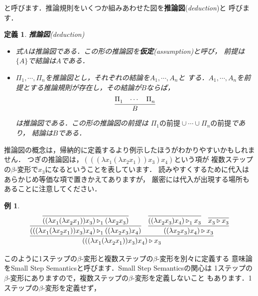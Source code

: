 \documentclass{ltjsbook}%
\newtheorem{definition}{定義}[section]%
\newtheorem{example}{例}[section]%
\newcommand\term[2]{\textbf{#1}{(\textit{#2})}}%
\begin{document}
と呼びます．推論規則をいくつか組みあわせた図を\term{推論図}{deduction}と%
呼びます．%
\begin{definition}%
\term{推論図}{deduction}%
\begin{itemize}%
\item 式$A$は推論図である．この形の推論図を\term{仮定}{assumption}と呼び，%
  前提は$\{A\}$で結論は$A$である．%
\item $\Pi_1^{},\cdots,\Pi_n^{}$を推論図とし，それぞれの結論を$A_1^{},\cdots,A_n^{}$と%
  する．$A_1^{},\cdots,A_n^{}$を前提とする推論規則が存在し，その結論が$B$ならば，%
  \begin{equation}%
    \infer{B}{\Pi_1^{}&\cdots&\Pi_n^{}}%
  \end{equation}%
  は推論図である．この形の推論図の前提は%
  $\Pi_1^{}の前提\cup\cdots\cup\Pi_n^{}の前提$であり，%
  結論は$B$である．%
\end{itemize}%
\end{definition}%
推論図の概念は，帰納的に定義するより例示したほうがわかりやすいかもしれません．%
つぎの推論図は，$(((\lambda x_1^{}(\lambda x_2^{} x_1^{}))x_3^{})x_4^{})$という項が%
複数ステップの$\beta$-変形で$x_3^{}$になるということを表しています．%
読みやすくするために代入はあらかじめ等価な項で置きかえてありますが，%
厳密には代入が出現する場所もあることに注意してください．%
\begin{example}%
  \begin{equation}%
    \infer{%
      (((\lambda x_1^{}(\lambda x_2^{} x_1^{}))x_3^{})x_4^{})\triangleright x_3^{}%
    }{%
      \infer{%
        (((\lambda x_1^{}(\lambda x_2^{} x_1^{}))x_3^{})x_4^{})\triangleright_1^{}%
        ((\lambda x_2^{} x_3^{})x_4^{})%
      }{%
        \infer{%
          ((\lambda x_1^{}(\lambda x_2^{} x_1^{}))x_3^{})\triangleright_1^{}%
          (\lambda x_2^{} x_3^{})%
        }{%
        }%
      }%
    &%
      \infer{%
        ((\lambda x_2^{} x_3^{})x_4^{})\triangleright x_3^{}%
      }{%
        \infer{%
          ((\lambda x_2^{} x_3^{})x_4^{})\triangleright_1^{}x_3^{}%
        }{%
        }%
      &%
        \infer{%
          x_3^{}\triangleright x_3^{}%
        }{%
        }%
      }%
    }%
  \end{equation}%
\end{example}%
\par このように1ステップの$\beta$-変形と複数ステップの$\beta$-変形を別々に定義する%
意味論をSmall Step Semanticsと呼びます．Small Step Semanticsの関心は%
1ステップの$\beta$-変形にありますので，複数ステップの$\beta$-変形を定義しないこと%
もあります．1ステップの$\beta$-変形を定義せず，%
\end{document}

